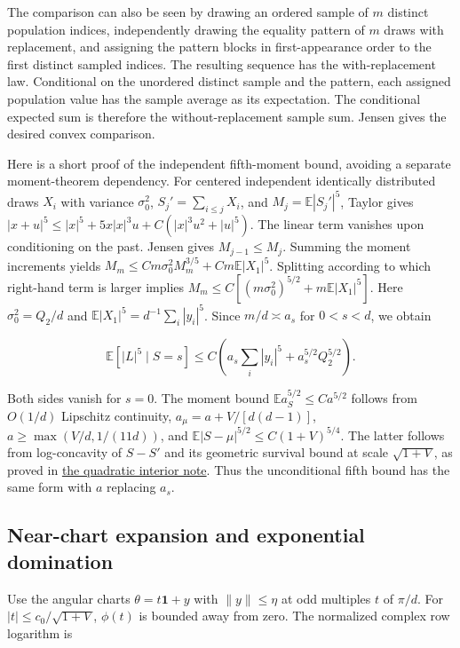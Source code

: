 The comparison can also be seen by drawing an ordered sample of $m$ distinct population indices, independently drawing the equality pattern of $m$ draws with replacement, and assigning the pattern blocks in first-appearance order to the first distinct sampled indices. The resulting sequence has the with-replacement law. Conditional on the unordered distinct sample and the pattern, each assigned population value has the sample average as its expectation. The conditional expected sum is therefore the without-replacement sample sum. Jensen gives the desired convex comparison.

Here is a short proof of the independent fifth-moment bound, avoiding a separate moment-theorem dependency. For centered independent identically distributed draws $X_i$ with variance $\sigma_0^2$, $S_j'=\sum_{i\le j}X_i$, and $M_j=\mathbb E|S_j'|^5$, Taylor gives
$|x+u|^5\le |x|^5+5x|x|^3u+C(|x|^3u^2+|u|^5)$. The linear term vanishes upon conditioning on the past. Jensen gives $M_{j-1}\le M_j$. Summing the moment increments yields $M_m\le C m\sigma_0^2 M_m^{3/5}+Cm\mathbb E|X_1|^5$. Splitting according to which right-hand term is larger implies $M_m\le C[(m\sigma_0^2)^{5/2}+m\mathbb E|X_1|^5]$. Here $\sigma_0^2=Q_2/d$ and $\mathbb E|X_1|^5=d^{-1}\sum_i|y_i|^5$. Since $m/d\asymp a_s$ for $0<s<d$, we obtain

\begin{equation*}
\mathbb E[|L|^5\mid S=s]\le C\left(a_s\sum_i|y_i|^5+a_s^{5/2}Q_2^{5/2}\right).
\end{equation*}

Both sides vanish for $s=0$. The moment bound $\mathbb E a_S^{5/2}\le C a^{5/2}$ follows from $O(1/d)$ Lipschitz continuity, $a_\mu=a+V/[d(d-1)]$, $a\ge\max(V/d,1/(11d))$, and $\mathbb E|S-\mu|^{5/2}\le C(1+V)^{5/4}$. The latter follows from log-concavity of $S-S'$ and its geometric survival bound at scale $\sqrt{1+V}$, as proved in \href{https://github.com/ProgramComputer/open-math-research/blob/4fb624ba937a8eecc1361a6066185cd81ab7b172/topics/balanced-arrays/quadratic/very-tall-quadratic-interior-saddle.md}{the quadratic interior note}. Thus the unconditional fifth bound has the same form with $a$ replacing $a_s$.

\subsection{Near-chart expansion and exponential domination}

Use the angular charts $\theta=t\mathbf1+y$ with $\|y\|\le\eta$ at odd multiples $t$ of $\pi/d$. For $|t|\le c_0/\sqrt{1+V}$, $\phi(t)$ is bounded away from zero. The normalized complex row logarithm is

